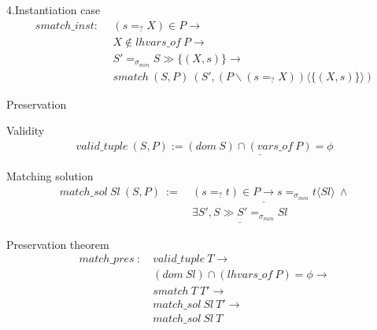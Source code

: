 \documentclass[10pt]{beamer}
\begin{document}
\begin{frame}
	\begin{block}{4.Instantiation case}
		\begin{align*}
			smatch\_inst : \ \ & (s=_?X) \in P \to \\
			& X \notin lhvars\_of \ P \to \\
			& S' =_{\sigma_{min}} S \gg \{(X,s)\} \to \\
			&  smatch \ (S,P) \ (S', (P \backslash (s=_?X))\langle \{(X,s)\} \rangle)  
		\end{align*}
	\end{block}
\end{frame}

\begin{frame}[t]{Preservation}
\begin{block}{Validity}
	\begin{align*}
		valid\_tuple \ (S,P) :=  \underline{(dom \ S) \cap (vars\_of \ P) = \phi}
	\end{align*}
\end{block}

\begin{block}{Matching solution}
	\begin{align*}
		match\_sol \ Sl \ (S,P) \ := \ &\underline{(s=_?t) \in P \to s =_{\sigma_{min}} t\langle Sl\rangle} \ \wedge  \\
		&\underline{\exists S', S \gg S' =_{\sigma_{min}} Sl} 
	\end{align*}
\end{block}

\begin{block}{Preservation theorem}
	\begin{align*}
	   match\_pres  \ : \ &valid\_tuple \ T \to \\
	                     &(dom \ Sl) \cap (lhvars\_of \ P) = \phi \to \\
	                     & smatch \ T \ T' \to  \\
	                     & match\_sol \ Sl \ T' \to \\
	                     & match\_sol \ Sl \ T 
	\end{align*}
\end{block}
\end{frame}
\end{document}
